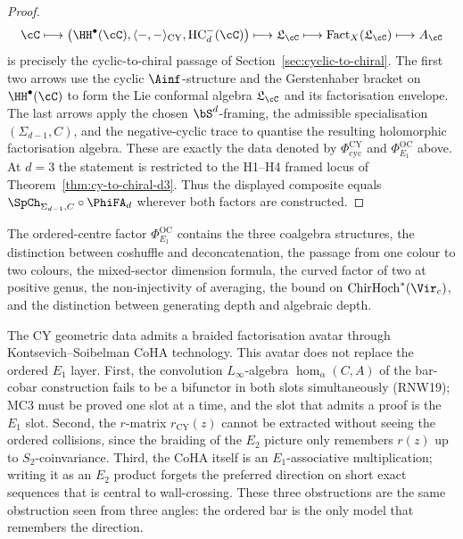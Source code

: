 \begin{proof}
\[
 \cC
 \longmapsto
 \bigl(\HH^\bullet(\cC),\langle-,-\rangle_{\mathrm{CY}},\mathrm{HC}^-_d(\cC)\bigr)
 \longmapsto
 \mathfrak{L}_\cC
 \longmapsto
 \mathrm{Fact}_X(\mathfrak{L}_\cC)
 \longmapsto
 A_\cC
\]
is precisely the cyclic-to-chiral passage of Section~\ref{sec:cyclic-to-chiral}. The first two arrows use the cyclic $\Ainf$-structure and the Gerstenhaber bracket on $\HH^\bullet(\cC)$ to form the Lie conformal algebra $\mathfrak{L}_\cC$ and its factorisation envelope. The last arrows apply the chosen $\bS^d$-framing, the admissible specialisation $(\Sigma_{d-1},C)$, and the negative-cyclic trace to quantise the resulting holomorphic factorisation algebra. These are exactly the data denoted by $\Phi^{\mathrm{CY}}_{\mathrm{cyc}}$ and $\Phi^{\mathrm{OC}}_{E_1}$ above. At $d=3$ the statement is restricted to the H1--H4 framed locus of Theorem~\ref{thm:cy-to-chiral-d3}. Thus the displayed composite equals $\SpCh_{\Sigma_{d-1},C}\circ\PhiFA_d$ wherever both factors are constructed.
\end{proof}

The ordered-centre factor $\Phi^{\mathrm{OC}}_{E_1}$ contains the three coalgebra structures, the distinction between coshuffle and deconcatenation, the passage from one colour to two colours, the mixed-sector dimension formula, the curved factor of two at positive genus, the non-injectivity of averaging, the bound on $\mathrm{ChirHoch}^\ast(\Vir_c)$, and the distinction between generating depth and algebraic depth.

\begin{remark}
\label{rem:why-e1-layer}
The CY geometric data admits a braided factorisation avatar through Kontsevich--Soibelman CoHA technology. This avatar does not replace the ordered $E_1$ layer. First, the convolution $L_\infty$-algebra $\hom_\alpha(C,A)$ of the bar-cobar construction fails to be a bifunctor in both slots simultaneously (RNW19); MC3 must be proved one slot at a time, and the slot that admits a proof is the $E_1$ slot. Second, the $r$-matrix $r_{\mathrm{CY}}(z)$ cannot be extracted without seeing the ordered collisions, since the braiding of the $E_2$ picture only remembers $r(z)$ up to $S_2$-coinvariance. Third, the CoHA itself is an $E_1$-associative multiplication; writing it as an $E_2$ product forgets the preferred direction on short exact sequences that is central to wall-crossing. These three obstructions are the same obstruction seen from three angles: the ordered bar is the only model that remembers the direction.
\end{remark}

